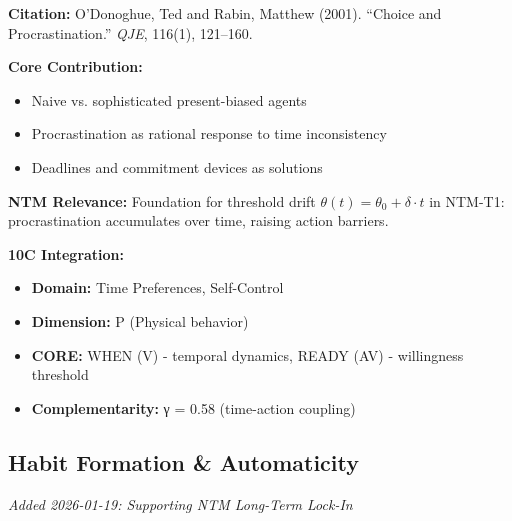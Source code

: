 \begin{tcolorbox}[colback=yellow!5!white,colframe=yellow!75!black,title=Key Paper: O'Donoghue \& Rabin (2001)]
\textbf{Citation:} O'Donoghue, Ted and Rabin, Matthew (2001). ``Choice and Procrastination.'' \textit{QJE}, 116(1), 121--160.

\textbf{Core Contribution:}
\begin{itemize}[nosep]
    \item Naive vs. sophisticated present-biased agents
    \item Procrastination as rational response to time inconsistency
    \item Deadlines and commitment devices as solutions
\end{itemize}

\textbf{NTM Relevance:} Foundation for threshold drift $\theta(t) = \theta_0 + \delta \cdot t$ in NTM-T1: procrastination accumulates over time, raising action barriers.

\textbf{10C Integration:}
\begin{itemize}[nosep]
    \item \textbf{Domain:} Time Preferences, Self-Control
    \item \textbf{Dimension:} P (Physical behavior)
    \item \textbf{CORE:} WHEN (V) - temporal dynamics, READY (AV) - willingness threshold
    \item \textbf{Complementarity:} γ = 0.58 (time-action coupling)
\end{itemize}
\end{tcolorbox}

\subsection{Habit Formation \& Automaticity}
\label{subsec:ot-habits}

\textit{Added 2026-01-19: Supporting NTM Long-Term Lock-In}

